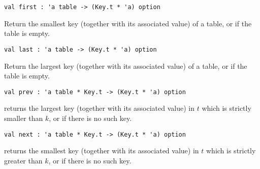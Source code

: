 \begin{cluster}
\label{grp:grm:ordtable-interface::first}

\begin{gram}[first]
\label{grm:ordtable-interface::first}
\begin{verbatim}
val first : 'a table -> (Key.t * 'a) option
\end{verbatim}
Return the smallest key (together with its associated value) of a table, or
 if the table is empty.

\end{gram}
\end{cluster}

\begin{cluster}
\label{grp:grm:ordtable-interface::last}

\begin{gram}[last]
\label{grm:ordtable-interface::last}
\begin{verbatim}
val last : 'a table -> (Key.t * 'a) option
\end{verbatim}
Return the largest key (together with its associated value) of a table, or
 if the table is empty.

\end{gram}
\end{cluster}

\begin{cluster}
\label{grp:grm:ordtable-interface::prev}

\begin{gram}[prev]
\label{grm:ordtable-interface::prev}
\begin{verbatim}
val prev : 'a table * Key.t -> (Key.t * 'a) option
\end{verbatim}
 returns the largest key (together with its associated value)
in $t$
which is strictly smaller than $k$, or  if there is no such key.

\end{gram}
\end{cluster}

\begin{cluster}
\label{grp:grm:ordtable-interface::next}

\begin{gram}[next]
\label{grm:ordtable-interface::next}
\begin{verbatim}
val next : 'a table * Key.t -> (Key.t * 'a) option
\end{verbatim}
 returns the smallest key (together with its associated value)
in $t$
which is strictly greater than $k$, or  if there is no such key.

\end{gram}
\end{cluster}

